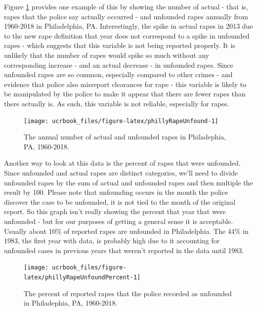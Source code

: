 \documentclass[
  12pt,
  openany]{book}
\begin{document}
Figure \ref{fig:phillyRapeUnfound} provides one example of this by showing the number of actual - that is, rapes that the police say actually occurred - and unfounded rapes annually from 1960-2018 in Philadelphia, PA. Interestingly, the spike in actual rapes in 2013 due to the new rape definition that year does not correspond to a spike in unfounded rapes - which suggests that this variable is not being reported properly. It is unlikely that the number of rapes would spike so much without any corresponding increase - and an actual decrease - in unfounded rapes. Since unfounded rapes are so common, especially compared to other crimes - and evidence that police also misreport clearances for rape - this variable is likely to be manipulated by the police to make it appear that there are fewer rapes than there actually is. As such, this variable is not reliable, especially for rapes.

\begin{figure}

{\centering \texttt{[image: ucrbook\_files/figure-latex/phillyRapeUnfound-1]} 

}

\caption{The annual number of actual and unfounded rapes in Philadephia, PA, 1960-2018.}\label{fig:phillyRapeUnfound}
\end{figure}

Another way to look at this data is the percent of rapes that were unfounded. Since unfounded and actual rapes are distinct categories, we'll need to divide unfounded rapes by the sum of actual and unfounded rapes and then multiple the result by 100. Please note that unfounding occurs in the month the police discover the case to be unfounded, it is not tied to the month of the original report. So this graph isn't really showing the percent that year that were unfounded - but for our purposes of getting a general sense it is acceptable. Usually about 10\% of reported rapes are unfounded in Philadelphia. The 44\% in 1983, the first year with data, is probably high due to it accounting for unfounded cases in previous years that weren't reported in the data until 1983.

\begin{figure}

{\centering \texttt{[image: ucrbook\_files/figure-latex/phillyRapeUnfoundPercent-1]} 

}

\caption{The percent of reported rapes that the police recorded as unfounded in Philadephia, PA, 1960-2018.}\label{fig:phillyRapeUnfoundPercent}
\end{figure}
\end{document}
